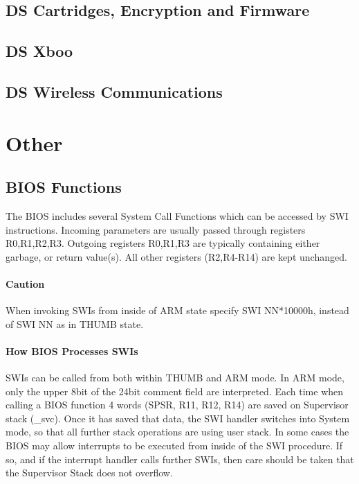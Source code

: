 \documentclass[11pt,a4paper]{proc}
\begin{document}
\begin{flushleft}
\subsection{DS Cartridges, Encryption and Firmware}

\subsection{DS Xboo}

\subsection{DS Wireless Communications}

\section{Other}

\subsection{BIOS Functions}

The BIOS includes several System Call Functions which can be accessed by SWI instructions. Incoming parameters are usually passed through registers R0,R1,R2,R3. Outgoing registers R0,R1,R3 are typically containing either garbage, or return value(s). All other registers (R2,R4-R14) are kept unchanged.

\paragraph{Caution}
When invoking SWIs from inside of ARM state specify SWI NN*10000h, instead of SWI NN as in THUMB state.

\paragraph{How BIOS Processes SWIs}
SWIs can be called from both within THUMB and ARM mode. In ARM mode, only the upper 8bit of the 24bit comment field are interpreted.
Each time when calling a BIOS function 4 words (SPSR, R11, R12, R14) are saved on Supervisor stack (\_svc). Once it has saved that data, the SWI handler switches into System mode, so that all further stack operations are using user stack.
In some cases the BIOS may allow interrupts to be executed from inside of the SWI procedure. If so, and if the interrupt handler calls further SWIs, then care should be taken that the Supervisor Stack does not overflow.


\end{flushleft}
\end{document}
